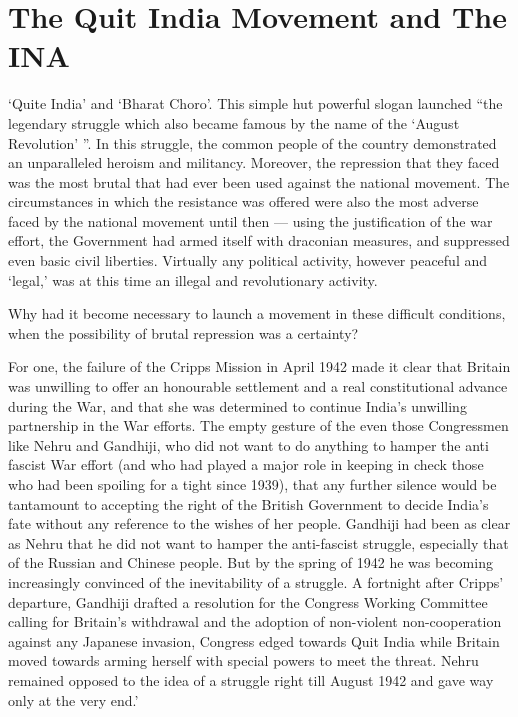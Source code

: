 \chapter[The Quit India Movement, INA \& Bharat Choro]{The Quit India Movement and The INA}
\begin{multicols}{2}

`Quite India' and `Bharat Choro'. This simple hut powerful slogan launched ``the legendary struggle which also became famous by the name of the `August Revolution' ''. In this struggle, the common people of the country demonstrated an unparalleled heroism and militancy. Moreover, the repression that they faced was the most brutal that had ever been used against the national movement. The circumstances in which the resistance was offered were also the most adverse faced by the national movement until then --- using the justification of the war effort, the Government had armed itself with draconian measures, and suppressed even basic civil liberties. Virtually any political activity, however peaceful and `legal,' was at this time an illegal and revolutionary activity.

Why had it become necessary to launch a movement in these difficult conditions, when the possibility of brutal repression was a certainty?

For one, the failure of the Cripps Mission in April 1942 made it clear that Britain was unwilling to offer an honourable settlement and a real constitutional advance during the War, and that she was determined to continue India's unwilling partnership in the War efforts. The empty gesture of the even those Congressmen like Nehru and Gandhiji, who did not want to do anything to hamper the anti fascist War effort (and who had played a major role in keeping in check those who had been spoiling for a tight since 1939), that any further silence would be tantamount to accepting the right of the British Government to decide India's fate without any reference to the wishes of her people. Gandhiji had been as clear as Nehru that he did not want to hamper the anti-fascist struggle, especially that of the Russian and Chinese people. But by the spring of 1942 he was becoming increasingly convinced of the inevitability of a struggle. A fortnight after Cripps' departure, Gandhiji drafted a resolution for the Congress Working Committee calling for Britain's withdrawal and the adoption of non-violent non-cooperation against any Japanese invasion, Congress edged towards Quit India while Britain moved towards arming herself with special powers to meet the threat. Nehru remained opposed to the idea of a struggle right till August 1942 and gave way only at the very end.'


\end{multicols}
